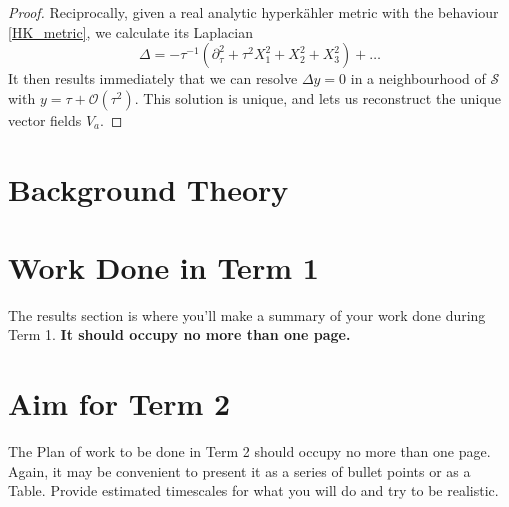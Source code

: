 \documentclass[a4paper,onecolumn,12pt]{article}
\theoremstyle{definition}
\theoremstyle{remark}
\newcommand{\HK}{hyperk\"ahler }
\begin{document}
\begin{proof}
	Reciprocally, given a real analytic \HK metric with the behaviour \ref{HK_metric}, we calculate its Laplacian
	\begin{equation}
		\Delta = -\tau^{-1}(\partial_{\tau}^{2} + \tau^{2}X_{1}^{2} + X_{2}^{2} + X_{3}^{2}) + \dots\label{key}
	\end{equation}
	It then results immediately that we can resolve $\Delta y=0$ in a neighbourhood of $\mathcal{S}$ with $y = \tau + \mathcal{O}(\tau^{2}).$ This solution is unique, and lets us reconstruct the unique vector fields $V_{a}.$
\end{proof}







\newpage
\section{Background Theory}




\section{Work Done in Term 1}
The results section is where you'll make a summary of your work done during Term 1. \textbf{It should occupy no more than one page.}

\section{Aim for Term 2}
The Plan of work to be done in Term 2 should occupy no more than one page.  Again, it may be convenient to present it as a series of bullet points or as a Table.  Provide estimated timescales for what you will do and try to be realistic.


 

\end{document}
